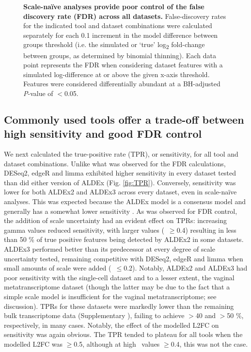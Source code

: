 \documentclass[10pt,letterpaper]{article}
\begin{document}
\begin{figure}[H]
    \centering
    \caption{\textbf{Scale-na\"ive analyses provide poor control of the false discovery rate (FDR) across all datasets.} False-discovery rates for the indicated tool and dataset combinations were calculated separately for each 0.1 increment in the model difference between groups threshold (i.e. the simulated or `true' log\textsubscript{2} fold-change between groups, as determined by binomial thinning). Each data point represents the FDR when considering dataset features with a simulated log-difference at or above the given x-axis threshold. Features were considered differentially abundant at a BH-adjusted \textit{P}-value of $<$0.05.}
    \label{fig:FDR}
\end{figure}

\subsection*{Commonly used tools offer a trade-off between high sensitivity and good FDR control}
We next calculated the true-positive rate (TPR), or sensitivity, for all tool and dataset combinations. Unlike what was observed for the FDR calculations, DESeq2, edgeR and limma exhibited higher sensitivity in every dataset tested than did either version of ALDEx (Fig. \ref{fig:TPR}). Conversely, sensitivity was lower for both ALDEx2 and ALDEx3 across every dataset, even in scale-na\"ive analyses. This was expected because the ALDEx model is a consensus model \cite{fernandes:2014} and generally has a somewhat lower sensitivity \cite{hawinkel2017, Nearing:2022aa}. As was observed for FDR control, the addition of scale uncertainty had an evident effect on TPRs: increasing gamma values reduced sensitivity, with larger values (\textgamma~$\geq$0.4) resulting in less than 50 \% of true positive features being detected by ALDEx2 in some datasets. ALDEx3 performed better than its predecessor at every degree of scale uncertainty tested, remaining competitive with DESeq2, edgeR and limma when small amounts of scale were added (\textgamma~$\leq$0.2). Notably, ALDEx2 and ALDEx3 had poor sensitivity with the single-cell dataset and to a lesser extent, the vaginal metatranscriptome dataset (though the latter may be due to the fact that a simple scale model is insufficient for the vaginal metatranscriptome; see discussion). TPRs for these datasets were markedly lower than the remaining bulk transcriptome data (Supplementary ), failing to achieve $>$40 and $>$50 \%, respectively, in many cases. Notably, the effect of the modelled L2FC on sensitivity was again obvious. The TPR tended to plateau for all tools when the modelled L2FC was $\geq$0.5, although at high \textgamma~values $\ge$0.4, this was not the case. 
\end{document}
